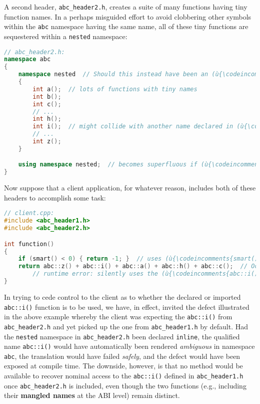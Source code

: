 \noindent A second header, \texttt{abc\_header2.h}, creates a suite of many
functions having tiny function names. In a perhaps misguided effort to
avoid clobbering other symbols within the \texttt{abc} namespace having
the same name, all of these tiny functions are sequestered within a
\texttt{nested} namespace:

\begin{lstlisting}[language=C++]
// abc_header2.h:
namespace abc
{
    namespace nested  // Should this instead have been an (ù{\codeincomments{inline}}ù) namespace?
    {
        int a();  // lots of functions with tiny names
        int b();
        int c();
        // ...
        int h();
        int i();  // might collide with another name declared in (ù{\codeincomments{abc}}ù)
        // ...
        int z();
    }

    using namespace nested;  // becomes superfluous if (ù{\codeincomments{nested}}ù) is made (ù{\codeincomments{inline}}ù)
}
\end{lstlisting}

\noindent Now suppose that a client application, for whatever reason, includes
both of these headers to accomplish some task:

\begin{lstlisting}[language=C++]
// client.cpp:
#include <abc_header1.h>
#include <abc_header2.h>

int function()
{
    if (smart() < 0) { return -1; }  // uses (ù{\codeincomments{smart()}}ù) from (ù{\codeincomments{abc\_header1.h}}ù)
    return abc::z() + abc::i() + abc::a() + abc::h() + abc::c();  // Oops!
        // runtime error: silently uses the (ù{\codeincomments{abc::i()}}ù) defined in (ù{\codeincomments{abc\_header1.h}}ù)
}
\end{lstlisting}

\noindent In trying to cede control to the client as to whether the declared or
imported \texttt{abc::i()} function is to be used, we have, in effect,
invited the defect illustrated in the above example whereby the client
was expecting the \texttt{abc::i()} from \texttt{abc\_header2.h} and yet
picked up the one from \texttt{abc\_header1.h} by default. Had the
\texttt{nested} namespace in \texttt{abc\_header2.h} been declared
\texttt{inline}, the qualified name \texttt{abc::i()} would have
automatically been rendered \emph{ambiguous} in namespace \texttt{abc},
the translation would have failed \emph{safely}, and the defect would
have been exposed at compile time. The downside, however, is that no
method would be available to recover nominal access to the
\texttt{abc::i()} defined in \texttt{abc\_header1.h} once
\texttt{abc\_header2.h} is included, even though the two functions
(e.g., including their \textbf{mangled names} at the ABI level) remain
distinct.

